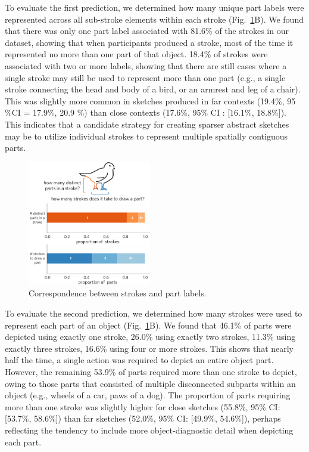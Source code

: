 \documentclass[10pt,letterpaper]{article}
\newcommand{\jefan}[1]{{\color{blue}{[jefan: #1]}}}
\begin{document}
To evaluate the first prediction, we determined how many unique part labels were represented across all sub-stroke elements within each stroke (Fig.~\ref{stroke_to_part}B). 
We found that there was only one part label associated with 81.6\% of the strokes in our dataset, showing that when participants produced a stroke, most of the time it represented no more than one part of that object. 
18.4\% of strokes were associated with two or more labels, showing that there are still cases where a single stroke may still be used to represent more than one part (e.g., a single stroke connecting the head and body of a bird, or an armrest and leg of a chair). 
This was slightly more common in sketches produced in far contexts (19.4\%, 95 \%CI = 17.9\%, 20.9 \%) than close contexts (17.6\%, 95\% CI : [16.1\%, 18.8\%]).  This indicates that a candidate strategy for creating sparser abstract sketches may be to utilize individual strokes to represent multiple spatially contiguous parts. 

\begin{figure}[htbp]
\centering
\includegraphics[width=0.48\textwidth]{figures/5_stroke_part_relationship.pdf}
\caption{Correspondence between strokes and part labels. \jefan{Horizontal axis labels here should be aligned.}}
\label{stroke_to_part}
\end{figure}

To evaluate the second prediction, we determined how many strokes were used to represent each part of an object (Fig.~\ref{stroke_to_part}B). 
We found that 46.1\% of parts were depicted using exactly one stroke, 26.0\% using exactly two strokes, 11.3\% using exactly three strokes, 16.6\% using four or more strokes. 
This shows that nearly half the time, a single action was required to depict an entire object part. 
However, the remaining 53.9\% of parts required more than one stroke to depict, owing to those parts that consisted of multiple disconnected subparts within an object (e.g., wheels of a car, paws of a dog).
\jefan{This should be verified in some way by subsetting on those feature columns that actually are likely to contain multiple instances per object.}
The proportion of parts requiring more than one stroke was slightly higher for close sketches (55.8\%, 95\% CI: [53.7\%, 58.6\%]) than far sketches (52.0\%, 95\% CI: [49.9\%, 54.6\%]), perhaps reflecting the tendency to include more object-diagnostic detail when depicting each part. 
\end{document}
